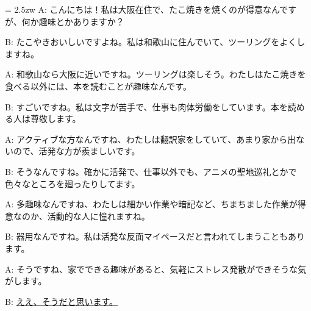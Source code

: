 \documentclass[11pt]{amsart}
\title{}
\author{}
\newenvironment{hangall}[1]{\hangindent = 2.5zw\everypar{\hangindent = 2.5zw}}{}
\begin{document}
\maketitle
\begin{hangall}{}%
A: こんにちは！私は大阪在住で、たこ焼きを焼くのが得意なんですが、何か趣味とかありますか？

B: たこやきおいしいですよね。私は和歌山に住んでいて、ツーリングをよくしますね。

A: 和歌山なら大阪に近いですね。ツーリングは楽しそう。わたしはたこ焼きを食べる以外には、本を読むことが趣味なんです。

B: すごいですね。私は文字が苦手で、仕事も肉体労働をしています。本を読める人は尊敬します。

A: アクティブな方なんですね、わたしは翻訳家をしていて、あまり家から出ないので、活発な方が羨ましいです。

B: そうなんですね。確かに活発で、仕事以外でも、アニメの聖地巡礼とかで色々なところを廻ったりしてます。

A: 多趣味なんですね、わたしは細かい作業や暗記など、ちまちました作業が得意なのか、活動的な人に憧れますね。

B: 器用なんですね。私は活発な反面マイペースだと言われてしまうこともあります。

A: そうですね、家でできる趣味があると、気軽にストレス発散ができそうな気がします。

B: \ul{ええ、そうだと思います。}\end{hangall}
\end{document}
